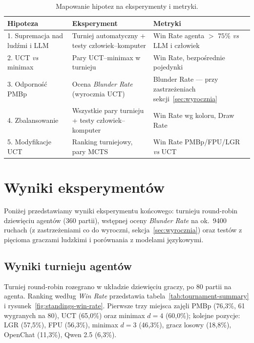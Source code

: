\documentclass[11pt, a4paper]{article}
\begin{document}
\begin{table}[H]
    \centering
    \caption{Mapowanie hipotez na eksperymenty i metryki.}
    \label{tab:hipotezy-metryki}
    \small
    \begin{tabular}{p{4.2cm}p{4.8cm}p{4.5cm}}
        \toprule
        \textbf{Hipoteza} & \textbf{Eksperyment} & \textbf{Metryki} \\
        \midrule
        1. Supremacja nad ludźmi i LLM &
        Turniej automatyczny + testy człowiek--komputer &
        Win Rate agenta $>$ $75\%$ \emph{vs} LLM i człowiek \\
        2. UCT \emph{vs} minimax &
        Pary UCT--minimax w turnieju &
        Win Rate, bezpośrednie pojedynki \\
        3. Odporność PMBp &
        Ocena \textit{Blunder Rate} (wyrocznia UCT) &
        Blunder Rate --- przy zastrzeżeniach sekcji~\ref{sec:wyrocznia} \\
        4. Zbalansowanie &
        Wszystkie pary turnieju + testy człowiek--komputer &
        Win Rate wg koloru, Draw Rate \\
        5. Modyfikacje UCT &
        Ranking turniejowy, pary MCTS &
        Win Rate PMBp/FPU/LGR \emph{vs} UCT \\
        \bottomrule
    \end{tabular}
\end{table}

\section{Wyniki eksperymentów}

Poniżej przedstawiamy wyniki eksperymentu końcowego: turnieju round-robin dziewięciu agentów (360 partii), wstępnej oceny \textit{Blunder Rate} na ok.\ 9400 ruchach (z zastrzeżeniami co do wyroczni, sekcja~\ref{sec:wyrocznia}) oraz testów z pięcioma graczami ludzkimi i porównania z modelami językowymi.

\subsection{Wyniki turnieju agentów}

Turniej round-robin rozegrano w układzie dziewięciu graczy, po 80 partii na agenta. Ranking według \textit{Win Rate} przedstawia tabela~\ref{tab:tournament-summary} i rysunek~\ref{fig:standings-win-rate}. Pierwsze trzy miejsca zajęli PMBp (76{,}3\%, 61 wygranych na 80), UCT (65{,}0\%) oraz minimax $d{=}4$ (60{,}0\%); kolejne pozycje: LGR (57{,}5\%), FPU (56{,}3\%), minimax $d{=}3$ (46{,}3\%), gracz losowy (18{,}8\%), OpenChat (11{,}3\%), Qwen 2.5 (6{,}3\%).
\end{document}
